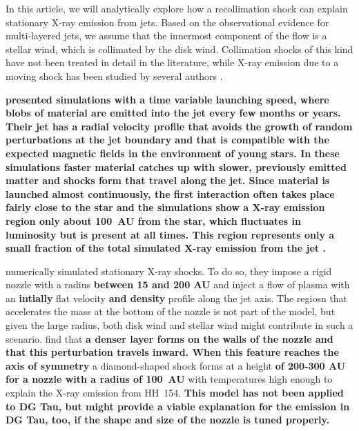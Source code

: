 In this article, we will analytically explore how a recollimation shock can explain stationary X-ray emission from jets. Based on the observational evidence for multi-layered jets, we assume that the innermost component of the flow is a stellar wind, which is collimated by the disk wind. Collimation shocks of this kind have not been treated in detail in the literature, while X-ray emission due to a moving shock has been studied by several authors \citep[see, e.g.\ the analytical work and numerical simulations by][]{2002ApJ...576L.149R,2007A&A...462..645B}.

\textbf{\citet{2010A&A...511A..42B} presented simulations with a time variable launching speed, where blobs of material are emitted into the jet every few months or years. Their jet has a radial velocity profile that avoids the growth of random perturbations at the jet boundary and that is compatible with the expected magnetic fields in the environment of young stars. In these simulations faster material catches up with slower, previously emitted matter and shocks form that travel along the jet. Since material is launched almost continuously, the first interaction often takes place fairly close to the star and the simulations show a X-ray emission region only about 100~AU from the star, which fluctuates in luminosity but is present at all times. This region represents only a small fraction of the total simulated X-ray emission from the jet \citep{2010A&A...517A..68B}. }

\citet{2011ApJ...737...54B} numerically simulated stationary X-ray shocks. To do so, they impose a rigid nozzle with a radius \textbf{between 15 and 200 AU} and inject a flow of plasma with an \textbf{intially} flat velocity \textbf{and density} profile along the jet axis. The regiosn that accelerates the mass at the bottom of the nozzle is not part of the model, but given the large radius, both disk wind and stellar wind might contribute in such a scenario. \citet{2011ApJ...737...54B} find that \textbf{a denser layer forms on the walls of the nozzle and that this perturbation travels inward. When this feature reaches the axis of symmetry} a diamond-shaped shock forms at a height \textbf{of 200-300 AU for a nozzle with a radius of 100~AU} with temperatures high enough to explain the X-ray emission from HH~154. \textbf{This model has not been applied to DG Tau, but might provide a viable explanation for the emission in DG Tau, too, if the shape and size of the nozzle is tuned properly.} 

